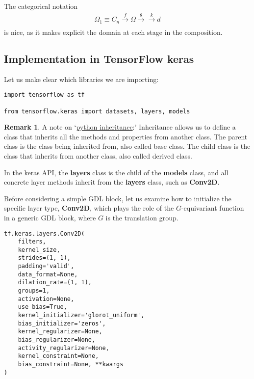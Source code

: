 \documentclass[12pt]{article}
\numberwithin{equation}{section}
\theoremstyle{definition}
\newtheorem{rmk}[thm]{Remark}
\newcommand{		\eq		}[1]	{	\begin{align*}#1\end{align*}	}%
\newcommand{		\B		}	{\textbf					} %
\newcommand{		\Oh		}	{	\Omega					}
\newcommand{		\1		}	{	\bm{1}					}%
\begin{document}
The categorical notation 
\eq{
\Oh_1 \equiv C_n  \xrightarrow[\,]{ f} \Oh  \xrightarrow[\,]{ g}  \xrightarrow[\,]{ k} d
}
is nice, as it makes explicit the domain at each stage in the composition. 

\newpage
\subsection{Implementation in TensorFlow keras} 

Let us make clear which libraries we are importing:

\vspace{5mm}

\begin{mdframed}
\begin{verbatim}
import tensorflow as tf 

from tensorflow.keras import datasets, layers, models
\end{verbatim}
\end{mdframed}

\vspace{5mm}

\begin{rmk}
A note on `\href{https://www.w3schools.com/python/python_inheritance.asp}{python inheritance}:' Inheritance allows us to define a class that inherits all the methods and properties from another class. The parent class is the class being inherited from, also called base class. The child class is the class that inherits from another class, also called derived class.

In the keras API, the \B{layers} class is the child of the \B{models} class, and all concrete layer methods inherit from the \B{layers} class, such as \B{Conv2D}. 
\end{rmk}

Before considering a simple GDL block, let us examine how to initialize the specific layer type, \B{Conv2D}, which plays the role of the $G$-equivariant function in a generic GDL block, where $G$ is the translation group. 

\vspace{5mm}

\begin{mdframed}
\begin{verbatim}
tf.keras.layers.Conv2D(
    filters, 
    kernel_size, 
    strides=(1, 1), 
    padding='valid',
    data_format=None, 
    dilation_rate=(1, 1), 
    groups=1, 
    activation=None,
    use_bias=True, 
    kernel_initializer='glorot_uniform',
    bias_initializer='zeros', 
    kernel_regularizer=None,
    bias_regularizer=None, 
    activity_regularizer=None, 
    kernel_constraint=None,
    bias_constraint=None, **kwargs
)
\end{verbatim}
\end{mdframed}
\end{document}
